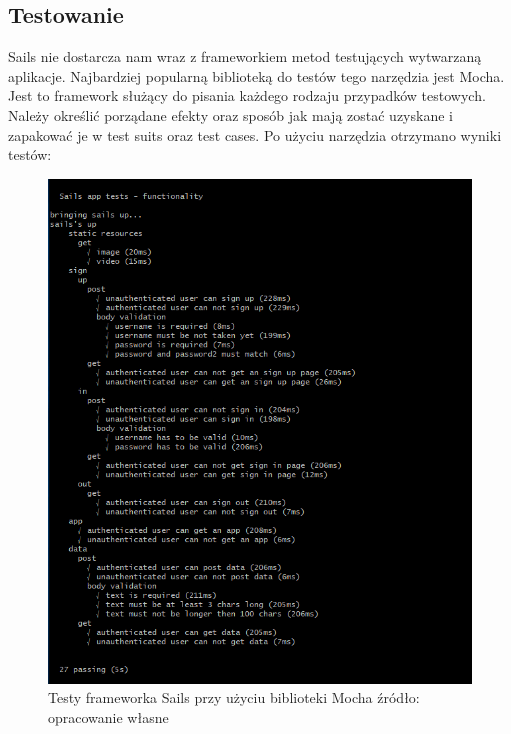 \documentclass[12pt]{report}
\begin{document}
    \subsection{Testowanie}
      Sails nie dostarcza nam wraz z frameworkiem metod testujących wytwarzaną aplikacje. 
      Najbardziej popularną biblioteką do testów tego narzędzia jest Mocha.
      Jest to framework służący do pisania każdego rodzaju przypadków testowych.
      Należy określić porządane efekty oraz sposób jak mają zostać uzyskane i zapakować je w test suits oraz test cases.
      Po użyciu narzędzia otrzymano wyniki testów:
      \begin{figure}[!hb]
        \centering
        \includegraphics[width=\textwidth,height=\textheight,keepaspectratio]{test_Sails.png} 
        \caption{Testy frameworka Sails przy użyciu biblioteki Mocha \newline źródło: opracowanie własne}
      \end{figure}
\end{document}
